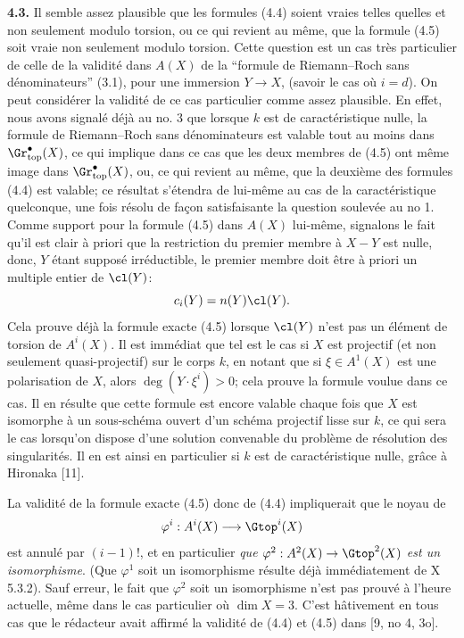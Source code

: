 \textbf{4.3.} Il semble assez plausible que les formules (4.4) soient vraies telles quelles et non seulement modulo torsion, ou ce qui revient au même, que la formule (4.5) soit vraie non seulement modulo torsion. Cette question est un cas très particulier de celle de la validité dans $A(X)$ de la ``formule de Riemann--Roch sans dénominateurs'' (3.1), pour une immersion $Y\to X$, (savoir le cas où $i=d$). On peut considérer la validité de ce cas particulier comme assez plausible. En effet, nous avons signalé déjà au no. 3 que lorsque $k$ est de caractéristique nulle, la formule de Riemann--Roch sans dénominateurs est valable tout au moins dans $\Gr^{\bullet}_{\mathrm{top}}(X)$, ce qui implique dans ce cas que les deux membres de (4.5) ont même image dans $\Gr^{\bullet}_{\mathrm{top}}(X)$, ou, ce qui revient au même, que la deuxième des formules (4.4) est valable; ce résultat s'étendra de lui-même au cas de la caractéristique quelconque, une fois résolu de
façon satisfaisante la question soulevée au no 1. Comme support pour la formule (4.5) dans $A(X)$ lui-même, signalons le fait qu'il est clair à priori que la restriction du premier membre à $X-Y$ est nulle, donc, $Y$ étant supposé irréductible, le premier membre doit être à priori un multiple entier de $\cl(Y)$:
\[
 c_i(Y)=n(Y)\cl(Y).
\]
Cela prouve déjà la formule exacte (4.5) lorsque $\cl(Y)$ n'est pas un élément de torsion de $A^i(X)$. Il est immédiat que tel est le cas si $X$ est projectif (et non seulement quasi-projectif) sur le corps $k$, en notant que si $\xi\in A^1(X)$ est une polarisation de $X$, alors $\deg(Y\cdot\xi^i)>0$; cela prouve la formule voulue dans ce cas. Il en résulte que cette formule est encore valable chaque fois que $X$ est isomorphe à un sous-schéma ouvert d'un schéma projectif lisse sur $k$, ce qui sera le cas lorsqu'on dispose d'une solution convenable du problème de résolution des singularités. Il en est ainsi en particulier si $k$ est de caractéristique nulle, grâce à Hironaka [11].

La validité de la formule exacte (4.5) donc de (4.4) impliquerait que le noyau de
\[
 \varphi^i:A^i(X)\longrightarrow \Gtop^i(X)
\]
est annulé par $(i-1)!$, et en particulier \emph{que $\varphi^2:A^2(X)\to\Gtop^2(X)$ est un isomorphisme}. (Que $\varphi^1$ soit un isomorphisme résulte déjà immédiatement de X 5.3.2). Sauf erreur, le fait que $\varphi^2$ soit un isomorphisme n'est pas prouvé à l'heure actuelle, même dans le cas particulier où $\dim X=3$. C'est hâtivement en tous cas que le rédacteur avait affirmé la validité de (4.4) et (4.5) dans [9, no 4, 3o].

